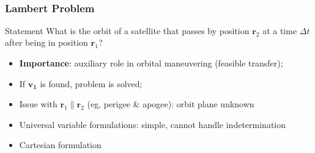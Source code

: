 \documentclass[handout]{beamer}
\begin{document}
\begin{frame}
\begin{columns}
\begin{column}{0.5\linewidth}
\begin{figure}[htbp]
                \caption{~\cite{curtis2015orbital}}
            \end{figure}
        \end{column}
    \end{columns}
\end{frame}

\begin{frame}
    \frametitle{Lambert Problem}
    \pause
    \begin{block}{Statement}
        What is the orbit of a satellite that passes by position \(\mathbf{r}_2\) at a time \(\Delta t\) after being in position \(\mathbf{r}_1\)?
    \end{block}
    \begin{itemize}\pause
        \item \textbf{Importance}: auxiliary role in orbital maneuvering (feasible transfer);\pause
        \item If \(\mathbf{v_1}\) is found, problem is solved;\pause
        \item Issue with \(\mathbf{r}_1 \parallel \mathbf{r}_2\) (eg, perigee \& apogee): orbit plane unknown\pause
        \item Universal variable formulations: simple, cannot handle indetermination~\cite{curtis2015orbital}\cite{sukhanov}\pause
        \item Cartesian formulation~\cite{embedded_lambert}\pause
    \end{itemize}
\end{frame}
\end{document}
